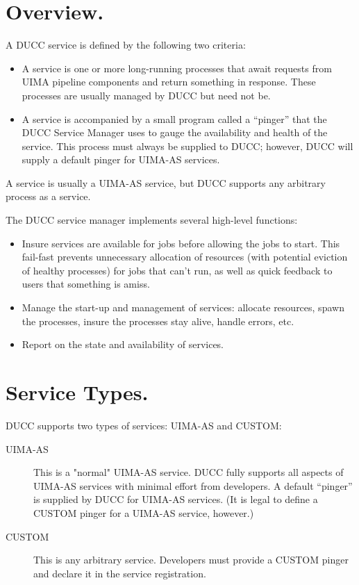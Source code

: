 
      \section{Overview.} 
      A DUCC service is defined by the following two criteria:
      \begin{itemize}
          \item A service is one or more long-running processes that await requests from
            UIMA pipeline components and return something in response.  These processes
            are usually managed by DUCC but need not be.
          \item A service is accompanied by a small program called a ``pinger'' that
            the DUCC Service Manager uses to gauge the availability and health of the
            service.  This process must always be supplied to DUCC; however, DUCC will
            supply a default pinger for UIMA-AS services.
      \end{itemize}

      A service is usually a UIMA-AS service, but DUCC supports any arbitrary process
      as a service.

      The DUCC service manager implements several high-level functions:
      
      \begin{itemize}
          \item Insure services are available for jobs before allowing the jobs to start. This fail-fast
            prevents unnecessary allocation of resources (with potential eviction of healthy processes)
            for jobs that can't run, as well as quick feedback to users that something is amiss.
      
          \item Manage the start-up and management of services: allocate resources, spawn the
            processes, insure the processes stay alive, handle errors, etc.
      
          \item Report on the state and availability of services.
       \end{itemize}


    \section{Service Types.}
    \label{sec:services.types}
      DUCC supports two types of services: UIMA-AS and CUSTOM:
      
      \begin{description}
          \item[UIMA-AS] This is a "normal" UIMA-AS service. DUCC fully supports all aspects of UIMA-AS
            services with minimal effort from developers.  A default ``pinger'' is supplied by DUCC
            for UIMA-AS services.  (It is legal to define a CUSTOM pinger for a UIMA-AS service,
            however.)
            
          \item[CUSTOM] This is any arbitrary service.  Developers must provide a CUSTOM pinger
            and declare it in the service registration.            
      \end{description}

